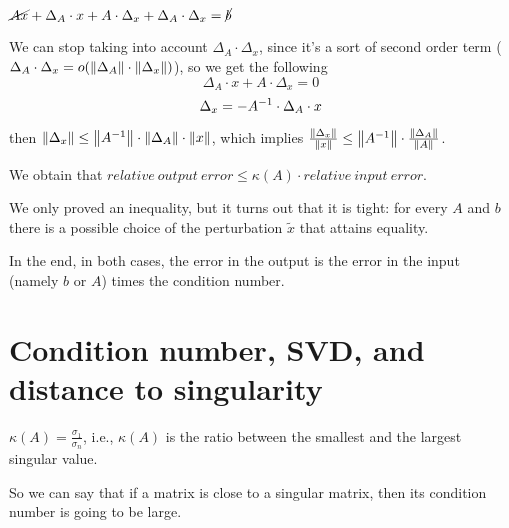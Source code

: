 \documentclass[computationalMathematics.tex]{subfiles}
\begin{document}
\begin{description}
    $\cancel{Ax} + \Delta_A \cdot x + A \cdot \Delta_x + \Delta_A \cdot \Delta_x = \cancel{b}$

We can stop taking into account $\Delta_A \cdot \Delta_x$, since it's a sort of second order term ($ \Delta_A \cdot \Delta_x = o (\left\lVert\Delta_A\right\rVert \cdot \left\lVert\Delta_x\right\rVert)$), so we get the following
  \[
      \Delta_A \cdot x + A \cdot \Delta_x = 0
  \]
  \[
      \Delta_x = -{A}^{-1} \cdot \Delta_A \cdot x
    \]

then $\left\lVert\Delta_x\right\rVert \le \left\lVert{A}^{-1}\right\rVert \cdot \left\lVert\Delta_A\right\rVert \cdot \left\lVert x\right\rVert$, which implies $\frac{\left\lVert\Delta_x\right\rVert}{\left\lVert x\right\rVert} \le \left\lVert{A}^{-1}\right\rVert \cdot \frac{\left\lVert\Delta_A\right\rVert}{\left\lVert A\right\rVert}$.

We obtain that $relative ~ output ~ error \le \kappa(A) \cdot relative ~ input ~ error$.
\end{description}
We only proved an inequality, but it turns out that it is tight: for every $A$ and $b$ there is a possible choice of the perturbation $\tilde{x}$ that attains equality.

In the end, in both cases, the error in the output is the error in the input (namely $b$ or $A$) times the condition number.

\section{Condition number, SVD, and distance to singularity}

\begin{proposition}
$\kappa(A) = \frac{\sigma_1}{\sigma_n}$, i.e., $\kappa(A)$ is the ratio between the smallest and the largest singular value.
\end{proposition}

So we can say that if a matrix is close to a singular matrix, then its condition number is going to be large.
\end{document}
